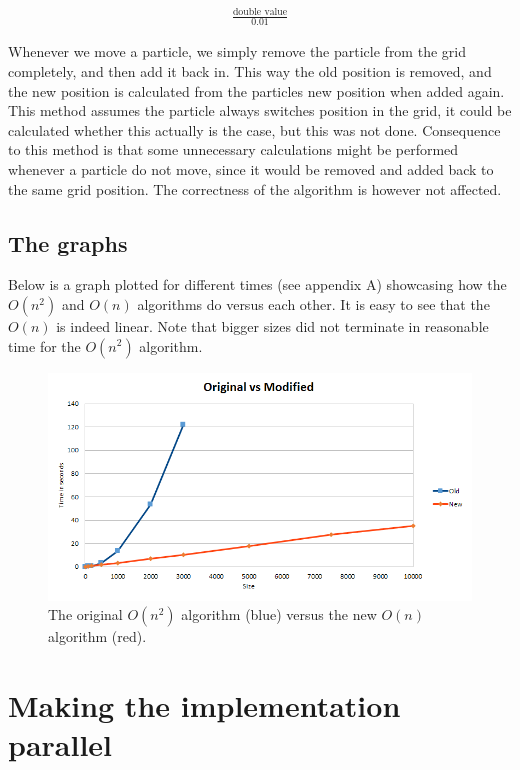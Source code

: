 \documentclass[a4paper,11pt,oneside]{book}
\begin{document}
\begin{align*}
\frac{\text{double value}}{0.01}
\end{align*}

Whenever we move a particle, we simply remove the particle from the grid completely, and then add it back in. This way the old position is removed, and the new position is calculated from the particles new position when added again. \\
This method assumes the particle always switches position in the grid, it could be calculated whether this actually is the case, but this was not done. Consequence to this method is that some unnecessary calculations might be performed whenever a particle do not move, since it would be removed and added back to the same grid position. The correctness of the algorithm is however not affected.

\section{The graphs}
Below is a graph plotted for different times (see appendix A) showcasing how the $O(n^{2})$ and $O(n)$ algorithms do versus each other. It is easy to see that the $O(n)$ is indeed linear. Note that bigger sizes did not terminate in reasonable time for the $O(n^{2})$ algorithm.

\begin{figure}[H]
  \centering
  \begin{minipage}[b]{0.9\textwidth}
    \includegraphics[width=\textwidth]{graph_regular.png}
    \caption{The original $O(n^{2})$ algorithm (blue) versus the new $O(n)$ algorithm (red).}
  \end{minipage}
\end{figure}


\chapter{Making the implementation parallel}
\end{document}
